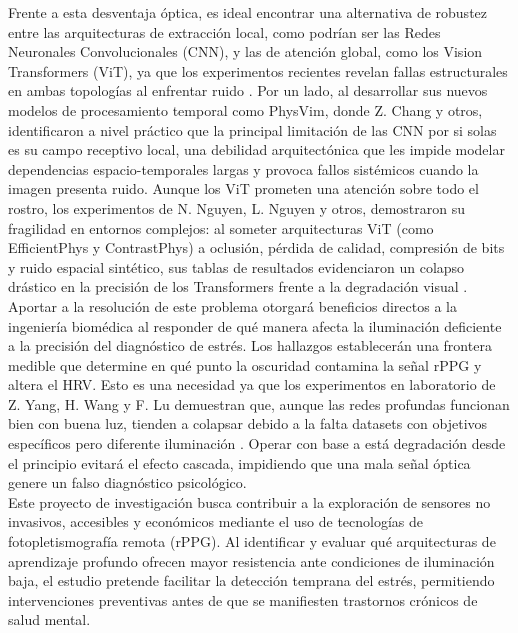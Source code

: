 Frente a esta desventaja óptica, es ideal encontrar una alternativa de robustez entre las arquitecturas de extracción local, como podrían ser las Redes 
Neuronales Convolucionales (CNN), y las de atención global, como los Vision Transformers (ViT), ya que los experimentos recientes revelan fallas estructurales en 
ambas topologías al enfrentar ruido \cite{chang2025physvim}. Por un lado, al desarrollar sus nuevos modelos de procesamiento temporal como PhysVim, donde Z. Chang y otros, identificaron a nivel práctico que la 
principal limitación de las CNN por si solas es su campo receptivo local, una debilidad arquitectónica que les impide modelar dependencias espacio-temporales largas y 
provoca fallos sistémicos cuando la imagen presenta ruido. Aunque los ViT prometen una atención sobre todo el rostro, los experimentos de 
N. Nguyen, L. Nguyen y otros, demostraron su fragilidad en entornos complejos: al someter arquitecturas ViT (como EfficientPhys y ContrastPhys) a oclusión, pérdida de calidad, 
compresión de bits y ruido espacial sintético, sus tablas de resultados evidenciaron un colapso drástico en la precisión de los Transformers frente a la 
degradación visual \cite{nguyen2024artifact_resilience}.\\

Aportar a la resolución de este problema otorgará beneficios directos a la ingeniería biomédica al responder de qué manera afecta la iluminación deficiente a la 
precisión del diagnóstico de estrés. Los hallazgos establecerán una frontera medible que determine en qué punto la oscuridad contamina la señal rPPG y 
altera el HRV. Esto es una necesidad ya que los experimentos en laboratorio de Z. Yang, H. Wang y F. Lu demuestran que, aunque las redes profundas funcionan bien con 
buena luz, tienden a colapsar debido a la falta datasets con objetivos específicos pero diferente iluminación \cite{yang2022assessment_dl}. Operar con base a está degradación desde el principio
evitará el efecto cascada, impidiendo que una mala señal óptica genere un falso diagnóstico psicológico.\\

Este proyecto de investigación busca contribuir a la exploración de sensores no invasivos, accesibles y económicos mediante el uso de tecnologías de fotopletismografía
remota (rPPG). Al identificar y evaluar qué arquitecturas de aprendizaje profundo ofrecen mayor resistencia ante condiciones de iluminación baja, el 
estudio pretende facilitar la detección temprana del estrés, permitiendo intervenciones preventivas antes de que se manifiesten trastornos crónicos de 
salud mental.